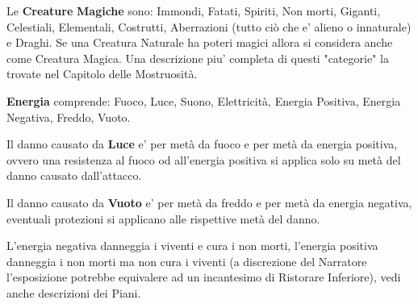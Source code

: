 \begin{multicols}{2}
\item Le \textbf{Creature} \textbf{Magiche} sono: Immondi, Fatati, Spiriti, Non morti, Giganti, Celestiali, Elementali, Costrutti, Aberrazioni (tutto ciò che e' alieno o innaturale) e Draghi.
Se una Creatura Naturale ha poteri magici allora si considera anche come Creatura Magica. Una descrizione piu' completa di questi "categorie" la trovate nel Capitolo delle Mostruosità.

\item \textbf{Energia} comprende: Fuoco, Luce, Suono, Elettricità, Energia Positiva, Energia Negativa, Freddo, Vuoto.

Il danno causato da \textbf{Luce} e' per metà da fuoco e per metà da energia positiva, ovvero una resistenza al fuoco od all'energia positiva si applica solo su metà del danno causato dall'attacco.

Il danno causato da \textbf{Vuoto} e' per metà da freddo e per metà da energia negativa, eventuali protezioni si applicano alle rispettive metà del danno.

L'energia negativa danneggia i viventi e cura i non morti, l'energia positiva danneggia i non morti ma non cura i viventi (a discrezione del Narratore l'esposizione potrebbe equivalere ad un incantesimo di Ristorare Inferiore), vedi anche descrizioni dei Piani.

\end{multicols}

\pagebreak

